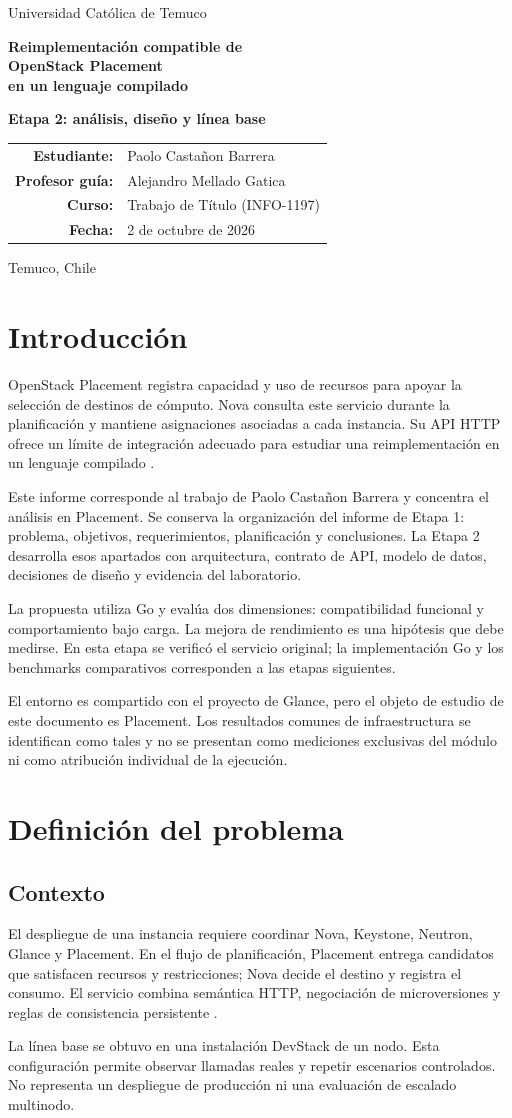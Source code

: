 \documentclass[12pt,a4paper]{article}
\newcommand{\reportcover}{
\hypersetup{pageanchor=false}
\begin{titlepage}\centering
\vspace*{0.3cm}
{\Large Universidad Católica de Temuco\par}
\vspace{0.2cm}{\large Ingeniería Civil en Informática\par}
\vspace{2cm}
{\LARGE\bfseries Reimplementación compatible de\\OpenStack Placement\\en un lenguaje compilado\par}
\vspace{0.65cm}
{\large\bfseries Etapa 2: análisis, diseño y línea base\par}
\vspace{1.8cm}
\begin{tabular}{rl}
\textbf{Estudiante:}&Paolo Castañon Barrera\\[0.35cm]
\textbf{Profesor guía:}&Alejandro Mellado Gatica\\[0.35cm]
\textbf{Curso:}&Trabajo de Título (INFO-1197)\\[0.35cm]
\textbf{Fecha:}&2 de octubre de 2026
\end{tabular}
\vfill Temuco, Chile
\end{titlepage}
\pagenumbering{arabic}\hypersetup{pageanchor=true}\begingroup\small\setlength{\parskip}{0pt}\tableofcontents\endgroup\newpage}
\begin{document}
\reportcover

\section{Introducción}
OpenStack Placement registra capacidad y uso de recursos para apoyar la selección de destinos de cómputo. Nova consulta este servicio durante la planificación y mantiene asignaciones asociadas a cada instancia. Su API HTTP ofrece un límite de integración adecuado para estudiar una reimplementación en un lenguaje compilado \cite{placementapi,nova}.

Este informe corresponde al trabajo de Paolo Castañon Barrera y concentra el análisis en Placement. Se conserva la organización del informe de Etapa 1: problema, objetivos, requerimientos, planificación y conclusiones. La Etapa 2 desarrolla esos apartados con arquitectura, contrato de API, modelo de datos, decisiones de diseño y evidencia del laboratorio.

La propuesta utiliza Go y evalúa dos dimensiones: compatibilidad funcional y comportamiento bajo carga. La mejora de rendimiento es una hipótesis que debe medirse. En esta etapa se verificó el servicio original; la implementación Go y los benchmarks comparativos corresponden a las etapas siguientes.

El entorno es compartido con el proyecto de Glance, pero el objeto de estudio de este documento es Placement. Los resultados comunes de infraestructura se identifican como tales y no se presentan como mediciones exclusivas del módulo ni como atribución individual de la ejecución.

\section{Definición del problema}
\subsection{Contexto}
El despliegue de una instancia requiere coordinar Nova, Keystone, Neutron, Glance y Placement. En el flujo de planificación, Placement entrega candidatos que satisfacen recursos y restricciones; Nova decide el destino y registra el consumo. El servicio combina semántica HTTP, negociación de microversiones y reglas de consistencia persistente \cite{placementapi,nova}.

La línea base se obtuvo en una instalación DevStack de un nodo. Esta configuración permite observar llamadas reales y repetir escenarios controlados. No representa un despliegue de producción ni una evaluación de escalado multinodo.
\end{document}
